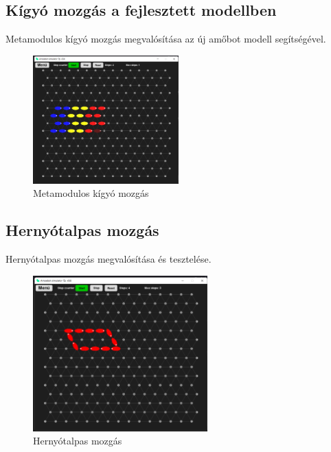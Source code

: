 \documentclass[	
  noindent
]{elteikthesis}[2024/04/26]
\begin{document}
      \subsection{Kígyó mozgás a fejlesztett modellben}
        Metamodulos kígyó mozgás megvalósítása az új amőbot modell segítségével.
      \begin{figure}[H]
      \centering
      \includegraphics[width=0.5\textwidth]{images/simulatons/08_snake.png}
      \caption{Metamodulos kígyó mozgás}
      \label{fig:08_snake}
      \end{figure}

      \subsection{Hernyótalpas mozgás}
        Hernyótalpas mozgás megvalósítása és tesztelése.
      \begin{figure}[H]
      \centering
      \includegraphics[width=0.6\textwidth]{images/simulatons/09_crawler.png}
      \caption{Hernyótalpas mozgás}
      \label{fig:09_crawler}
      \end{figure}
\end{document}

